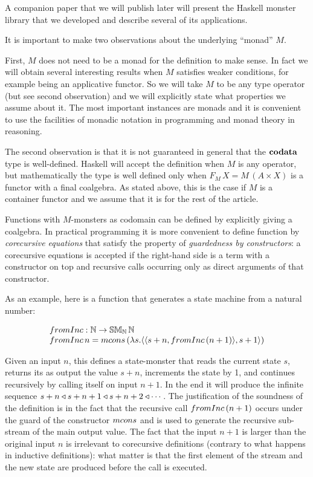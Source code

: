 A companion paper that we will publish later will present the Haskell monster library that we developed and describe several of its applications.

It is important to make two observations about the underlying ``monad'' $M$.

First, $M$ does not need to be a monad for the definition to make sense. 
In fact we will obtain several interesting results when $M$ satisfies weaker conditions, for example being an applicative functor.
So we will take $M$ to be any type operator (but see second observation) and we will explicitly state what properties we assume about it.
The most important instances are monads and it is convenient to use the facilities of monadic notation in programming and monad theory in reasoning.

The second observation is that it is not guaranteed in general that the $\mathbf{codata}$ type is well-defined.
Haskell will accept the definition when $M$ is any operator, but mathematically the type is well defined only when $F_M\,X = M\,(A\times X)$ is a functor with a final coalgebra.
As stated above, this is the case if $M$ is a container functor and we assume that it is for the rest of the article.

Functions with $M$-monsters as codomain can be defined by explicitly giving a coalgebra.
In practical programming it is more convenient to define function by {\em corecursive equations} that satisfy the property of {\em guardedness by constructors}:
a corecursive equations is accepted if the right-hand side is a term with a constructor on top and recursive calls occurring only as direct arguments of that constructor.

As an example, here is a function that generates a state machine from a natural number:

$$
\begin{array}{l}
\frominc : \nat \rightarrow \stmon{\nat}\,\nat \\
\frominc\, n = \mcons\, (\lambda s. \pair{\pair{s+n}{\frominc\, (n + 1)}}{s + 1})
\end{array}
$$

Given an input $n$, this defines a state-monster that reads the current state $s$, returns its as output the value $s+n$, increments the state by 1, and continues recursively by calling itself on input $n+1$.
In the end it will produce the infinite sequence $s+n \triangleleft s+n+1 \triangleleft s+n+2 \triangleleft \cdots$.
The justification of the soundness of the definition is in the fact that the recursive call $\frominc\, (n + 1)$ occurs under the guard of the constructor $\mcons $ and is used to generate the recursive sub-stream of the main output value.
The fact that the input $n+1$ is larger than the original input $n$ is irrelevant to corecursive definitions (contrary to what happens in inductive definitions): what matter is that the first element of the stream and the new state are produced before the call is executed.

